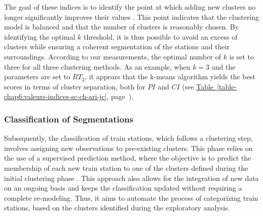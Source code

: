 \begin{refsegment}
The goal of these indices is to identify the point at which adding new clusters no longer significantly improves their values \textcolor{blue}{\autocite[23]{jahaniana_selecting_2022}}. This point indicates that the clustering model is balanced and that the number of clusters is reasonably chosen. By identifying the optimal \(k\) threshold, it is thus possible to avoid an excess of clusters while ensuring a coherent segmentation of the stations and their surroundings. According to our measurements, the optimal number of \(k\) is set to three for all three clustering methods. As an example, when \(k = 3\) and the parameters are set to \(RT_{2}\), it appears that the k-means algorithm yields the best scores in terms of cluster separation, both for \(PI\) and \(CI\) (see \hyperref[table-chap6:valeurs-indices-sc-ch-ari-jc]{Table~\ref{table-chap6:valeurs-indices-sc-ch-ari-jc}}, page~\pageref{table-chap6:valeurs-indices-sc-ch-ari-jc}).%

\subsubsection*{Classification of Segmentations
    \label{chap6:methodologie-statistiques-classification}
    }

Subsequently, the classification of train stations, which follows a clustering step, involves assigning new observations to pre-existing clusters. This phase relies on the use of a supervised prediction method, where the objective is to predict the membership of each new train station to one of the clusters defined during the initial clustering phase \textcolor{blue}{\autocite[134-135]{james_introduction_2013}}. This approach also allows for the integration of new data on an ongoing basis and keeps the classification updated without requiring a complete re-modeling. Thus, it aims to automate the process of categorizing train stations, based on the clusters identified during the exploratory analysis.%



\end{refsegment}
